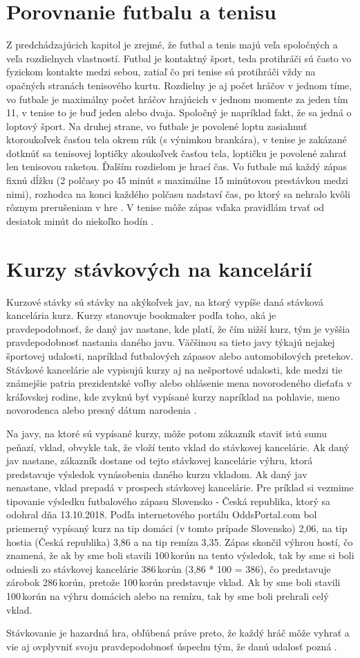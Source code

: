 \section{Porovnanie futbalu a tenisu}
Z predchádzajúcich kapitol je zrejmé, že futbal a tenis majú veľa spoločných a veľa rozdielnych vlastností. 
Futbal je kontaktný šport, teda protihráči sú často vo fyzickom kontakte medzi sebou, zatiaľ čo pri tenise sú protihráči vždy na opačných stranách tenisového kurtu. 
Rozdielny je aj počet hráčov v jednom tíme, vo futbale je maximálny počet hráčov hrajúcich v jednom momente za jeden tím 11, v tenise to je buď jeden alebo dvaja.
Spoločný je napríklad fakt, že sa jedná o loptový šport. 
Na druhej strane, vo futbale je povolené loptu zasiahnuť ktoroukoľvek časťou tela okrem rúk (s výnimkou brankára), v tenise je zakázané dotknúť sa tenisovej loptičky akoukoľvek časťou tela, loptičku je povolené zahrať len tenisovou raketou.
Ďalším rozdielom je hrací čas. Vo futbale má každý zápas fixnú dĺžku (2 polčasy po 45 minút s maximálne 15 minútovou prestávkou medzi nimi), rozhodca na konci každého polčasu nadstaví čas, po ktorý sa nehralo kvôli rôznym prerušeniam v hre 
\citep{hry1}.
V tenise môže zápas vďaka pravidlám trvať od desiatok minút do niekoľko hodín \citep{tenis:kor}.


\section{Kurzy stávkových na kancelárií}
Kurzové stávky sú stávky na akýkoľvek jav, na ktorý vypíše daná stávková kancelária kurz. 
Kurzy stanovuje bookmaker podľa toho, aká je pravdepodobnosť, že daný jav nastane, kde platí, že čím nižší kurz, tým je vyššia pravdepodobnosť nastania daného javu. 
Väčšinou sa tieto javy týkajú nejakej športovej udalosti, napríklad futbalových zápasov alebo automobilových pretekov. 
Stávkové kancelárie ale vypisujú kurzy aj na nešportové udalosti, kde medzi tie známejšie patria prezidentské voľby \citep{bet:pres} alebo ohlásenie mena novorodeného dieťaťa v kráľovskej rodine, kde zvyknú byť vypísané kurzy napríklad na pohlavie, meno novorodenca alebo presný dátum narodenia \citep{bet:prince}.

Na javy, na ktoré sú vypísané kurzy, môže potom zákazník staviť istú sumu peňazí, vklad, obvykle tak, že vloží tento vklad do stávkovej kancelárie. 
Ak daný jav nastane, zákazník dostane od tejto stávkovej kancelárie výhru, ktorá predstavuje výsledok vynásobenia daného kurzu vkladom.
Ak daný jav nenastane, vklad prepadá v prospech stávkovej kancelárie.
Pre príklad si vezmime tipovanie výsledku futbalového zápasu Slovensko - Česká republika, ktorý sa odohral dňa 13.10.2018. 
Podľa internetového portálu OddsPortal.com bol priemerný vypísaný kurz na tip domáci (v tomto prípade Slovensko) 2,06, na tip hostia (Česká republika) 3,86 a na tip remíza 3,35.
Zápas skončil výhrou hostí, čo znamená, že ak by sme boli stavili 100\,\rm korún na tento výsledok, tak by sme si boli odniesli zo stávkovej kancelárie 386\,\rm korún  (3,86 * 100 = 386), čo predstavuje zárobok 286\,\rm korún, pretože 100\,\rm korún predstavuje vklad.
Ak by sme boli stavili 100\,\rm korún na výhru domácich alebo na remízu, tak by sme boli prehrali celý vklad.

Stávkovanie je hazardná hra, obľúbená práve preto, že každý hráč môže vyhrať a vie aj ovplyvniť svoju pravdepodobnosť úspechu tým, že danú udalosť pozná \citep{odds}.







